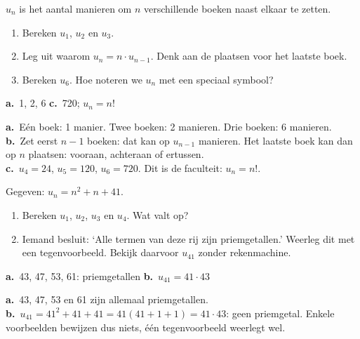 \begin{oefeningen}
\begin{oefening}[2]
 $u_n$ is het aantal manieren om $n$ verschillende boeken naast elkaar te zetten.
\begin{enumerate}
  \item Bereken $u_1$, $u_2$ en $u_3$.
  \item Leg uit waarom $u_n = n \cdot u_{n-1}$. Denk aan de plaatsen voor het laatste boek.
  \item Bereken $u_6$. Hoe noteren we $u_n$ met een speciaal symbool?
\end{enumerate}
\begin{solution}
\textbf{a.}~1, 2, 6 \quad \textbf{c.}~720; $u_n=n!$
\end{solution}
\begin{fullsolution}
\textbf{a.}~Eén boek: 1 manier. Twee boeken: 2 manieren. Drie boeken: 6 manieren.\\
\textbf{b.}~Zet eerst $n-1$ boeken: dat kan op $u_{n-1}$ manieren. Het laatste boek kan dan op $n$ plaatsen: vooraan, achteraan of ertussen.\\
\textbf{c.}~$u_4=24$, $u_5=120$, $u_6=720$. Dit is de faculteit: $u_n=n!$.
\end{fullsolution}
\end{oefening}

\begin{oefening}[2]
 Gegeven: $u_n = n^2 + n + 41$.
\begin{enumerate}
  \item Bereken $u_1$, $u_2$, $u_3$ en $u_4$. Wat valt op?
  \item Iemand besluit: `Alle termen van deze rij zijn priemgetallen.' Weerleg dit met een tegenvoorbeeld. Bekijk daarvoor $u_{41}$ zonder rekenmachine.
\end{enumerate}
\begin{solution}
\textbf{a.}~43, 47, 53, 61: priemgetallen \quad \textbf{b.}~$u_{41}=41\cdot 43$
\end{solution}
\begin{fullsolution}
\textbf{a.}~43, 47, 53 en 61 zijn allemaal priemgetallen.\\
\textbf{b.}~$u_{41}=41^2+41+41=41(41+1+1)=41\cdot 43$: geen priemgetal. Enkele voorbeelden bewijzen dus niets, één tegenvoorbeeld weerlegt wel.
\end{fullsolution}
\end{oefening}
\end{oefeningen}

